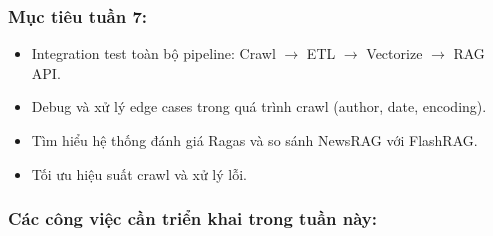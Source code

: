 \hypertarget{mux1ee5c-tiuxeau-tuux1ea7n-7}{%
\subsubsection{Mục tiêu tuần 7:}}

\begin{itemize}
\tightlist
\item
  Integration test toàn bộ pipeline: Crawl \(\rightarrow\) ETL
  \(\rightarrow\) Vectorize \(\rightarrow\) RAG API.
\item
  Debug và xử lý edge cases trong quá trình crawl (author, date,
  encoding).
\item
  Tìm hiểu hệ thống đánh giá Ragas và so sánh NewsRAG với FlashRAG.
\item
  Tối ưu hiệu suất crawl và xử lý lỗi.
\end{itemize}

\hypertarget{cuxe1c-cuxf4ng-viux1ec7c-cux1ea7n-triux1ec3n-khai-trong-tuux1ea7n-nuxe0y}{%
\subsubsection{Các công việc cần triển khai trong tuần
này:}}


